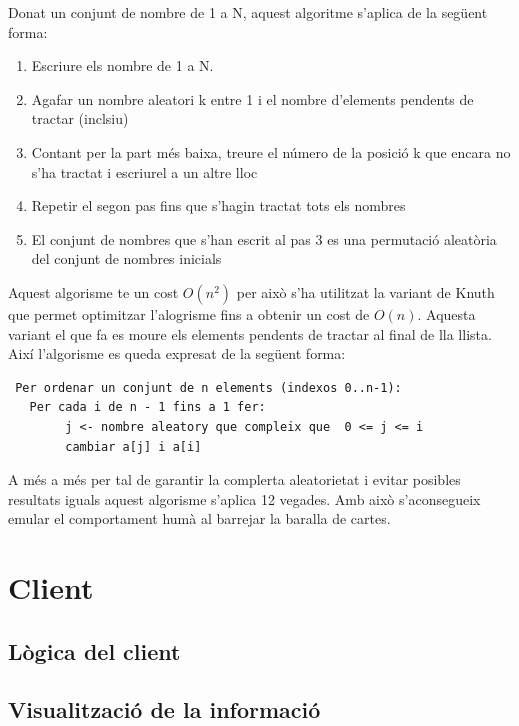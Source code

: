 Donat un conjunt de nombre de 1 a N, aquest algoritme s'aplica de la següent forma: 
\begin{enumerate}
\item{Escriure els nombre de 1 a N.}
\item{Agafar un nombre aleatori k entre 1 i el nombre d'elements pendents de tractar (inclsiu)}
\item{Contant per la part més baixa, treure el número de la posició k que encara no s'ha tractat i escriurel a un altre lloc}
\item{Repetir el segon pas fins que s'hagin tractat tots els nombres}
\item{El conjunt de nombres que s'han escrit al pas 3 es una permutació aleatòria del conjunt de nombres inicials}
\end{enumerate}

Aquest algorisme te un cost $O(n^2)$ per això s'ha utilitzat la variant de Knuth que permet optimitzar l'alogrisme fins a obtenir un cost de $O(n)$. Aquesta variant el que fa es moure els elements pendents de tractar al final de lla llista. Així l'algorisme es queda expresat de la següent forma: 

\begin{verbatim}
 Per ordenar un conjunt de n elements (indexos 0..n-1):
   Per cada i de n - 1 fins a 1 fer:
        j <- nombre aleatory que compleix que  0 <= j <= i
        cambiar a[j] i a[i]
\end{verbatim}

A més a més per tal de garantir la complerta aleatorietat i evitar posibles resultats iguals aquest algorisme s'aplica 12 vegades. Amb això s'aconsegueix emular el comportament humà al barrejar la baralla de cartes. 

\section{Client}

\subsection{Lògica del client}

\subsection{Visualització de la informació}
